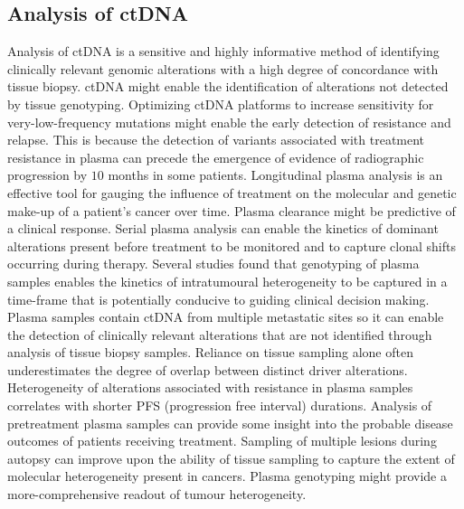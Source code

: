 	\subsection{Analysis of ctDNA}
	Analysis of ctDNA is a sensitive and highly informative method of identifying clinically relevant genomic alterations with a high degree of concordance with tissue biopsy.
	ctDNA might enable the identification of alterations not detected by tissue genotyping.
	Optimizing ctDNA platforms to increase sensitivity for very-low-frequency mutations might enable the early detection of resistance and relapse.
	This is because the detection of variants associated with treatment resistance in plasma can precede the emergence of evidence of radiographic progression by $10$ months in some patients.
	Longitudinal plasma analysis is an effective tool for gauging the influence of treatment on the molecular and genetic make-up of a patient's cancer over time.
	Plasma clearance might be predictive of a clinical response.
	Serial plasma analysis can enable the kinetics of dominant alterations present before treatment to be monitored and to capture clonal shifts occurring during therapy.
	Several studies found that genotyping of plasma samples enables the kinetics of intratumoural heterogeneity to be captured in a time-frame that is potentially conducive to guiding clinical decision making.
	Plasma samples contain ctDNA from multiple metastatic sites so it can enable the detection of clinically relevant alterations that are not identified through analysis of tissue biopsy samples.
	Reliance on tissue sampling alone often underestimates the degree of overlap between distinct driver alterations.
	Heterogeneity of alterations associated with resistance in plasma samples correlates with shorter PFS (progression free interval) durations.
	Analysis of pretreatment plasma samples can provide some insight into the probable disease outcomes of patients receiving treatment.
	Sampling of multiple lesions during autopsy can improve upon the ability of tissue sampling to capture the extent of molecular heterogeneity present in cancers.
	Plasma genotyping might provide a more-comprehensive readout of tumour heterogeneity.

